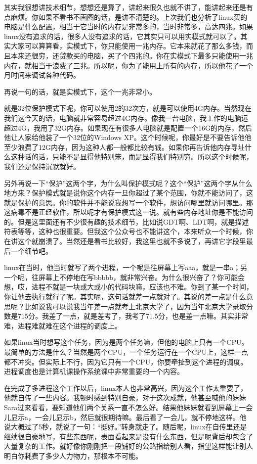 \documentclass[
  letterpaper,
  DIV=11,
  numbers=noendperiod]{scrreprt}
\begin{document}
其实我很想讲技术细节，想想还是算了，讲起来很久也就不讲了，能讲起来还是有点麻烦。你如果不看书不画图的话，是讲不清楚的。上次我们也分析了linux买的电脑是什么配置，相当于它当时的内存是非常多的，当时非常多，高达四兆。如果linux没有追求的话，很多人没有追求的话，它其实只可以用实模式就可以了。其实大家可以算算看，实模式下，你只能使用一兆内存。它本来就花了那么多钱，而且本来还很穷，还贷款买的电脑，买了个四兆的。你在实模式下最多只能使用一兆内存，就相当于浪费了三兆。所以呢，你为了能用上所有的内存，所以他花了一个月时间来调试各种代码。

再说一句的话，就是实模式下，这个一兆非常小。

就是32位保护模式下呢，你可以使用2的32次方，就是可以使用4G内存。当然现在我们这今天的话，电脑就非常容易超过4G内存。像我一台电脑，我工作的电脑远超过4G，我用了32G内存。如果现在有很多人电脑就是配置一个16G的内存，然后他让人家给他装了一个32位的Windows
XP。这个时候呢，你最好是不要告诉他他至少浪费了12G内存，因为这种人都一般都比较有钱。如果你再告诉他内存寻址什么这种话的话，只能不是显得他特别笨，而是显得我们特别穷。所以这个时候呢，我们还是保持沉默就好。

另外再说一下``保护''这两个字，为什么叫保护模式呢？这个``保护''这两个字从什么地方来？保护模式就是说你这个内存一旦你超过了某个范围，你就不能访问了，这就是保护的意思。你的软件并不能说我想写一个软件，想访问哪里就访问哪里。那这病毒不是正经软件，所以呢才有保护模式这一说。就有些内存地址你是不能访问的。但是这里面还有不少很有趣的技术细节，比如说GDT啊、LDT啊，就是描述符表等等，这种也很重要。但我这个公众号也不能讲这个，本来听众一个时候，你在讲这个就崩溃了。当然还是看书比较好，我这里也就不多说了，再讲它字段里最后一个细节吧。

linux在当时，他当时就写了两个进程，一个呢是往屏幕上写aaa，就是一串a；另一个呢，往屏幕上不停地在写bbbbb，就非常兴奋。为什么很兴奋了？你可能会想，哎，进程不就是一块或大或小的代码块嘛，应该也不难。你到了某一个时间，你让他去执行就行了呢。其实呢，这句话就差一点就对了。其说的差一点是什么意思呢？比如说我可以说我当年差一点就考上北京大学了，因为当年北京大学录取分数是715分。我差了一点，就是差考了，我考了71.5分，也是差一点嘛。其实非常难，进程难就难在这个进程的调度上。

如果linux当时想写这个任务，因为是两个任务嘛，但他的电脑上只有一个CPU。最简单的方法是什么？当然是两个CPU，一个任务运行在一个CPU上，这样一点都不冲突。但实际上不行，因为它只有一个CPU，你要牵扯到这个进程的调度。进程调度也是计算机课操作系统课中非常重要的一个内容。

在完成了多进程这个工作以后，linux本人也非常高兴，因为这个工作太重要了，他就自传了一些内容。我顿时感到特别自豪，对于这次成就，他甚至喊他的妹妹Sara过来看看，要知道他们两个关系一直不怎么好。结果他妹妹就看到屏幕上一会儿显示a，一会儿显示b，然后就很期待嘛。最后看了一会儿，就不停地这样。他说大概过了5秒，就说了一句：``挺好。''转身就走了。随后呢，linux在自传里还是继续很自豪地写，有些东西呢，表面看起来是没有什么东西，但是呢背后却包含了大量复杂的工作。就好像你刚刚把一段铺好的公路指给别人看，指望这样能让别人明白你耗费了多少人力物力，那根本不可能。
\end{document}
